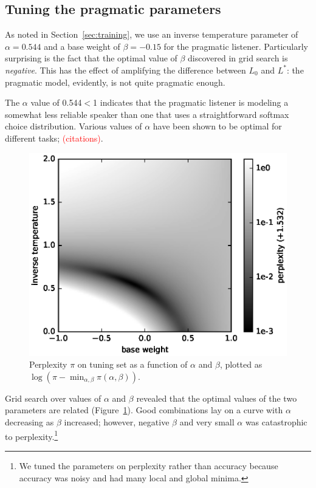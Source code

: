 \documentclass[11pt,letterpaper]{article}
\newcommand{\Listener}{L}
\renewcommand{\|}{\mid}
\newcommand{\secref}[1]{Section~\ref{#1}}
\newcommand{\figref}[1]{Figure~\ref{#1}}
\newcommand{\todocheck}[1]{\textcolor{red}{#1}}
\begin{document}
\subsection{Tuning the pragmatic parameters} \label{sec:alpha_beta}

As noted in \secref{sec:training}, we use an inverse temperature parameter of
$\alpha = 0.544$ and a base weight of $\beta = -0.15$ for the pragmatic
listener. Particularly surprising is the fact that the optimal value of $\beta$
discovered in grid search is \emph{negative}. This has the effect of amplifying
the difference between $\Listener_0$ and $\Listener^*$: the pragmatic model,
evidently, is not quite pragmatic enough.

The $\alpha$ value of 0.544${}<{}$1 indicates that the pragmatic listener is
modeling a somewhat less reliable speaker than one that uses a straightforward
softmax choice distribution. Various values of $\alpha$ have been shown to
be optimal for different tasks; \todocheck{(citations)}.

\begin{figure}
\centering
\includegraphics[width=\columnwidth]{figures/alpha_beta.eps}
\caption{Perplexity $\pi$ on tuning set as a function of $\alpha$ and $\beta$, plotted as $\log(\pi - \min_{\alpha,\beta} \pi(\alpha, \beta))$.}
\label{fig:alpha_beta}
\end{figure}

Grid search over values of $\alpha$ and $\beta$ revealed that the optimal values of 
the two parameters are related (\figref{fig:alpha_beta}). Good combinations lay on
a curve with $\alpha$ decreasing as $\beta$ increased; however, negative $\beta$ and
very small $\alpha$ was catastrophic to perplexity.\footnote{We tuned the
parameters on perplexity rather than accuracy because accuracy was noisy and had
many local and global minima.}
\end{document}
